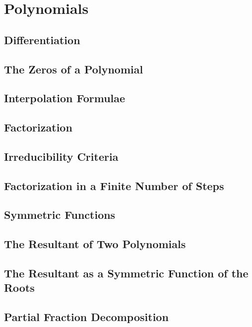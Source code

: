 \section{Polynomials}

\subsection{Differentiation}

\subsection{The Zeros of a Polynomial}

\subsection{Interpolation Formulae}

\subsection{Factorization}

\subsection{Irreducibility Criteria}

\subsection{Factorization in a Finite Number of Steps}

\subsection{Symmetric Functions}

\subsection{The Resultant of Two Polynomials}

\subsection{The Resultant as a Symmetric Function of the Roots}

\subsection{Partial Fraction Decomposition}